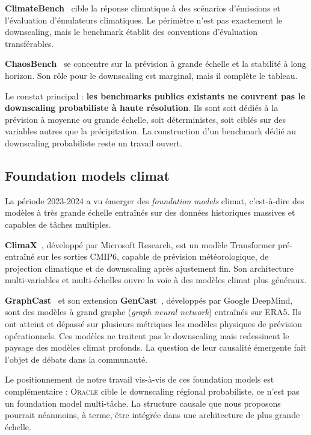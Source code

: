 \documentclass[14pt,a4paper,openany]{extreport}
\theoremstyle{definition}
\newcommand{\Oracle}{\textsc{Oracle}}
\begin{document}
\textbf{ClimateBench}~\cite{watson_climatebench_2022} cible la réponse climatique à des scénarios d'émissions et l'évaluation d'émulateurs climatiques. Le périmètre n'est pas exactement le downscaling, mais le benchmark établit des conventions d'évaluation transférables.

\textbf{ChaosBench}~\cite{nathaniel_chaosbench_2024} se concentre sur la prévision à grande échelle et la stabilité à long horizon. Son rôle pour le downscaling est marginal, mais il complète le tableau.

Le constat principal : \textbf{les benchmarks publics existants ne couvrent pas le downscaling probabiliste à haute résolution}. Ils sont soit dédiés à la prévision à moyenne ou grande échelle, soit déterministes, soit ciblés sur des variables autres que la précipitation. La construction d'un benchmark dédié au downscaling probabiliste reste un travail ouvert.

\subsection{Foundation models climat}
\label{ssec:soa-foundation}

La période 2023-2024 a vu émerger des \emph{foundation models} climat, c'est-à-dire des modèles à très grande échelle entraînés sur des données historiques massives et capables de tâches multiples.

\textbf{ClimaX}~\cite{nguyen_climax_2023}, développé par Microsoft Research, est un modèle Transformer pré-entraîné sur les sorties CMIP6, capable de prévision météorologique, de projection climatique et de downscaling après ajustement fin. Son architecture multi-variables et multi-échelles ouvre la voie à des modèles climat plus généraux.

\textbf{GraphCast}~\cite{lam_graphcast_2023} et son extension \textbf{GenCast}~\cite{price_gencast_2024}, développés par Google DeepMind, sont des modèles à grand graphe (\emph{graph neural network}) entraînés sur ERA5. Ils ont atteint et dépassé sur plusieurs métriques les modèles physiques de prévision opérationnels. Ces modèles ne traitent pas le downscaling mais redessinent le paysage des modèles climat profonds. La question de leur causalité émergente fait l'objet de débats dans la communauté.

Le positionnement de notre travail vis-à-vis de ces foundation models est complémentaire : \Oracle{} cible le downscaling régional probabiliste, ce n'est pas un foundation model multi-tâche. La structure causale que nous proposons pourrait néanmoins, à terme, être intégrée dans une architecture de plus grande échelle.
\end{document}

